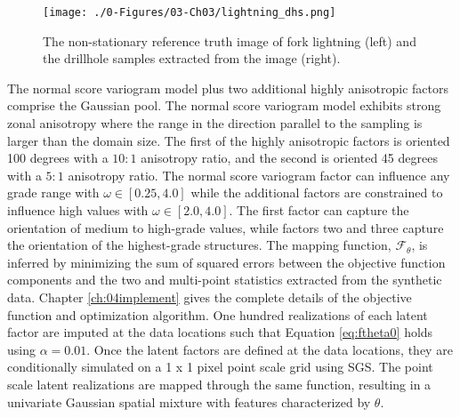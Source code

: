 \begin{figure}[htb!]
    \centering
    \texttt{[image: ./0-Figures/03-Ch03/lightning\_dhs.png]}
    \caption{The non-stationary reference truth image of fork lightning (left) and the drillhole samples extracted from the image (right). }
    \label{fig:lightning_dhs}
\end{figure}

The normal score variogram model plus two additional highly anisotropic factors comprise the Gaussian pool. The normal score variogram model exhibits strong zonal anisotropy where the range in the direction parallel to the sampling is larger than the domain size. The first of the highly anisotropic factors is oriented 100 degrees with a $10:1$ anisotropy ratio, and the second is oriented 45 degrees with a  $5:1$ anisotropy ratio. The normal score variogram factor can influence any grade range with $\omega \in [0.25, 4.0]$ while the additional factors are constrained to influence high values with $\omega \in [2.0, 4.0]$. The first factor can capture the orientation of medium to high-grade values, while factors two and three capture the orientation of the highest-grade structures. The mapping function, $\mathcal{F}_{\theta}$, is inferred by minimizing the sum of squared errors between the objective function components and the two and multi-point statistics extracted from the synthetic data. Chapter \ref{ch:04implement} gives the complete details of the objective function and optimization algorithm. One hundred realizations of each latent factor are imputed at the data locations such that Equation \ref{eq:ftheta0} holds using $\alpha = 0.01$. Once the latent factors are defined at the data locations, they are conditionally simulated on a 1 x 1 pixel point scale grid using \gls{SGS}. The point scale latent realizations are mapped through the same function, resulting in a univariate Gaussian spatial mixture with features characterized by $\theta$.

